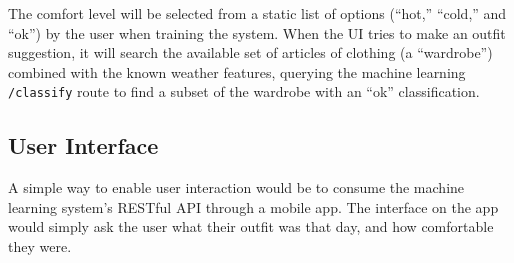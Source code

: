The comfort level will be selected from a static list of options (``hot,'' ``cold,'' and ``ok'') by the user when
training the system. When the UI tries to make an outfit suggestion, it will search the available set of articles of
clothing (a ``wardrobe'') combined with the known weather features, querying the machine learning \texttt{/classify}
route to find a subset of the wardrobe with an ``ok'' classification.


\subsection{User Interface}
A simple way to enable user interaction would be to consume the machine learning system's RESTful API through a
mobile app. The interface on the app would simply ask the user what their outfit was that day, and how comfortable
they were.
